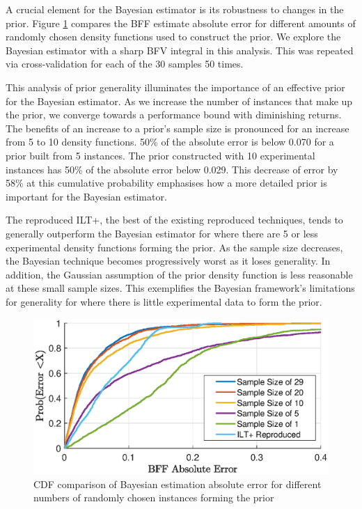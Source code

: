 A crucial element for the Bayesian estimator is its robustness to changes in the prior. Figure \ref{fig:different_prior} compares the BFF estimate absolute error for different amounts of randomly chosen density functions used to construct the prior. We explore the Bayesian estimator with a sharp BFV integral in this analysis. This was repeated via cross-validation for each of the 30 samples 50 times.

This analysis of prior generality illuminates the importance of an effective prior for the Bayesian estimator. As we increase the number of instances that make up the prior, we converge towards a performance bound with diminishing returns. The benefits of an increase to a prior's sample size is pronounced for an increase from 5 to 10 density functions. 50\% of the absolute error is below 0.070 for a prior built from 5 instances. The prior constructed with 10 experimental instances has 50\% of the absolute error below 0.029. This decrease of error by 58\% at this cumulative probability emphasises how a more detailed prior is important for the Bayesian estimator.

The reproduced ILT+, the best of the existing reproduced techniques, tends to generally outperform the Bayesian estimator for where there are 5 or less experimental density functions forming the prior. As the sample size decreases, the Bayesian technique becomes progressively worst as it loses generality. In addition, the Gaussian assumption of the prior density function is less reasonable at these small sample sizes. This exemplifies the Bayesian framework's limitations for generality for where there is little experimental data to form the prior.

\begin{figure}[htb!]
    \centering
    \includegraphics[width=\textwidth]{evaluation/different_priors.eps}
    \caption{CDF comparison of Bayesian estimation absolute error for different numbers of randomly chosen instances forming the prior}
    \label{fig:different_prior}
\end{figure}

